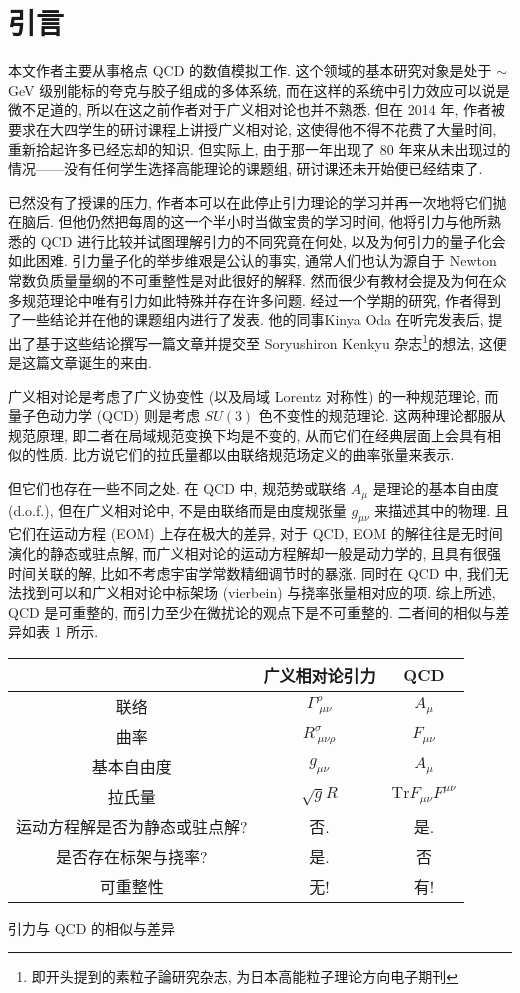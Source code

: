 \documentclass{article}
\begin{document}
\section{引言}
本文作者主要从事格点 QCD 的数值模拟工作. 这个领域的基本研究对象是处于 $\sim$GeV 级别能标的夸克与胶子组成的多体系统, 而在这样的系统中引力效应可以说是微不足道的, 所以在这之前作者对于广义相对论也并不熟悉. 但在 2014 年, 作者被要求在大四学生的研讨课程上讲授广义相对论, 这使得他不得不花费了大量时间, 重新拾起许多已经忘却的知识. 但实际上, 由于那一年出现了 80 年来从未出现过的情况——没有任何学生选择高能理论的课题组, 研讨课还未开始便已经结束了.
\par
已然没有了授课的压力, 作者本可以在此停止引力理论的学习并再一次地将它们抛在脑后. 但他仍然把每周的这一个半小时当做宝贵的学习时间, 他将引力与他所熟悉的 QCD 进行比较并试图理解引力的不同究竟在何处, 以及为何引力的量子化会如此困难. 引力量子化的举步维艰是公认的事实, 通常人们也认为源自于 Newton 常数负质量量纲的不可重整性是对此很好的解释. 然而很少有教材会提及为何在众多规范理论中唯有引力如此特殊并存在许多问题. 经过一个学期的研究, 作者得到了一些结论并在他的课题组内进行了发表. 他的同事Kinya Oda 在听完发表后, 提出了基于这些结论撰写一篇文章并提交至 Soryushiron Kenkyu 杂志\footnote{即开头提到的素粒子論研究杂志, 为日本高能粒子理论方向电子期刊}的想法, 这便是这篇文章诞生的来由.
\par
广义相对论是考虑了广义协变性 (以及局域 Lorentz 对称性) 的一种规范理论, 而量子色动力学 (QCD) 则是考虑 $SU(3)$ 色不变性的规范理论. 这两种理论都服从规范原理, 即二者在局域规范变换下均是不变的, 从而它们在经典层面上会具有相似的性质. 比方说它们的拉氏量都以由联络规范场定义的曲率张量来表示.
\par
但它们也存在一些不同之处. 在 QCD 中, 规范势或联络 $A_{\mu}$ 是理论的基本自由度 (d.o.f.), 但在广义相对论中, 不是由联络而是由度规张量 $g_{\mu\nu}$ 来描述其中的物理. 且它们在运动方程 (EOM) 上存在极大的差异, 对于 QCD, EOM 的解往往是无时间演化的静态或驻点解, 而广义相对论的运动方程解却一般是动力学的, 且具有很强时间关联的解, 比如不考虑宇宙学常数精细调节时的暴涨. 同时在 QCD 中, 我们无法找到可以和广义相对论中标架场 (vierbein) 与挠率张量相对应的项. 综上所述, QCD 是可重整的, 而引力至少在微扰论的观点下是不可重整的. 二者间的相似与差异如表 1 所示.
\begin{center}
\begin{tabular}{|c|c|c|}
  \hline
   & 广义相对论引力 & QCD \\
   \hline
  联络 & $\Gamma^{\rho}_{\ \mu\nu}$ & $A_{\mu}$ \\
  曲率 & $R^{\sigma}_{\ \mu\nu\rho}$ & $F_{\mu\nu}$ \\
  基本自由度 & $g_{\mu\nu}$ & $A_{\mu}$ \\
  拉氏量 & $\sqrt{g}R$ & $\textrm{Tr}{F_{\mu\nu}F^{\mu\nu}}$ \\
  运动方程解是否为静态或驻点解? & 否. & 是. \\
  是否存在标架与挠率? & 是. & 否 \\
  可重整性 & 无! & 有! \\
  \hline
\end{tabular}
\caption{引力与 QCD 的相似与差异}
\end{center}
\end{document}
